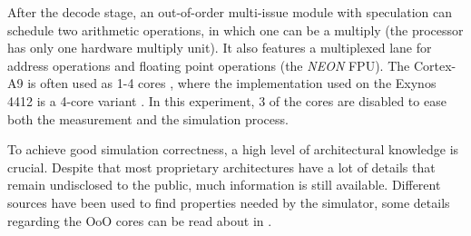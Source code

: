 After the decode stage, an out-of-order multi-issue module with speculation can
schedule two arithmetic operations, in which one can be a multiply (the
processor has only one hardware multiply unit). It also features a multiplexed lane
for address operations and floating point operations (the \emph{NEON} FPU). The
Cortex-A9 is often used as 1-4 cores \cite{armsite}, where the implementation
used on the Exynos 4412 is a 4-core variant \cite{somesite}. In this experiment,
3 of the cores are disabled to ease both the measurement and the simulation
process.

To achieve good simulation correctness, a high level of architectural knowledge
is crucial. Despite that most proprietary architectures have a lot of details
that remain undisclosed to the public, much information is still available.
Different sources have been used to find properties needed by the simulator,
some details regarding the OoO cores can be read about in
\cite{blem2013detailed}.
